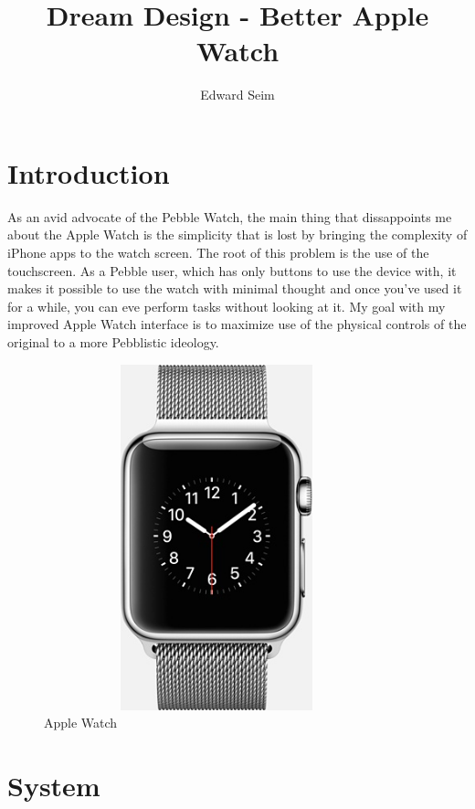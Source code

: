 \documentclass[journal,letterpaper]{article}
\title{Dream Design - Better Apple Watch}
\author{Edward Seim}
\begin{document}
    \maketitle
    
    \section{Introduction}
    \label{introduction}

    As an avid advocate of the Pebble Watch, the main thing that dissappoints me about the Apple Watch is the simplicity that is lost by bringing the complexity of iPhone apps to the watch screen. The root of this problem is the use of the touchscreen. As a Pebble user, which has only buttons to use the device with, it makes it possible to use the watch with minimal thought and once you've used it for a while, you can eve perform tasks without looking at it. My goal with my improved Apple Watch interface is to maximize use of the physical controls of the original to a more Pebblistic ideology.

    \begin{figure}[htbp]
        \centering
        \includegraphics[width=10cm,height=10cm,keepaspectratio]{apple-watch}
        \caption{Apple Watch}
        \label{fig:apple_watch}
    \end{figure}

    \section{System}
    \label{System}
\end{document}
